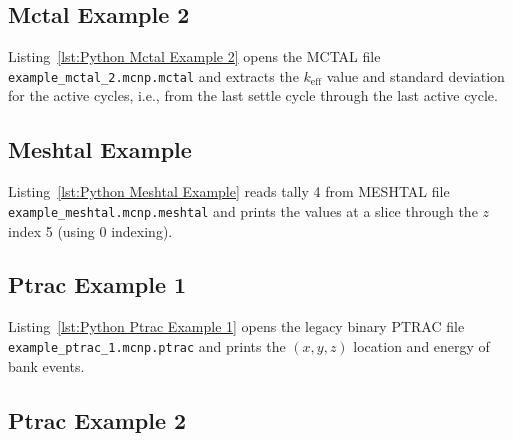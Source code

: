 \documentclass[11pt]{article}
\begin{document}
\clearpage
\subsection{Mctal Example 2}\label{mctal-example-2-1}

Listing~\ref{lst:Python Mctal Example 2} opens the MCTAL file
\texttt{example\_mctal\_2.mcnp.mctal} and extracts the $k_{\mathrm{eff}}$ value
and standard deviation for the active cycles, i.e., from the last settle cycle
through the last active cycle.



\clearpage
\subsection{Meshtal Example}\label{meshtal-example-1}

Listing~\ref{lst:Python Meshtal Example} reads tally 4 from MESHTAL file
\texttt{example\_meshtal.mcnp.meshtal} and prints the values at a slice through
the $z$ index 5 (using 0 indexing).



\clearpage
\subsection{Ptrac Example 1}\label{ptrac-example-1-1}

Listing~\ref{lst:Python Ptrac Example 1} opens the legacy binary PTRAC file
\texttt{example\_ptrac\_1.mcnp.ptrac} and prints the $\left(x,y,z\right)$
location and energy of bank events.



\clearpage
\subsection{Ptrac Example 2}\label{ptrac-example-2-1}
\end{document}
